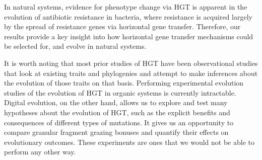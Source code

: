 \documentclass[PhD]{msu-thesis}
\begin{document}
In natural systems, evidence for phenotype change via HGT is apparent in the evolution of antibiotic resistance in bacteria, where resistance is acquired largely by the spread of resistance genes via horizontal gene transfer. Therefore, our results provide a key insight into how horizontal gene transfer mechanisms could be selected for, and evolve in natural systems.

It is worth noting that most prior studies of HGT have been observational studies that look at existing traits and phylogenies and attempt to make inferences about the evolution of those traits on that basis. Performing experimental evolution studies of the evolution of HGT in organic systems is 
currently intractable.  %
Digital evolution, on the other hand, allows us to explore and test many hypotheses about the evolution of HGT, such as the explicit benefits and consequences of different types of mutations. It gives us an opportunity to compare granular fragment grazing bonuses and quantify their effects on evolutionary outcomes. These experiments are ones that we would not be able to perform any other way.   
\end{document}
